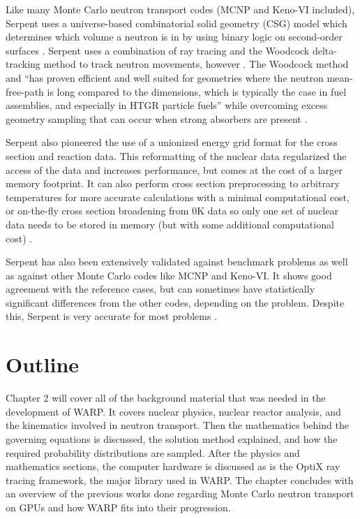 Like many Monte Carlo neutron transport codes (MCNP and Keno-VI included), Serpent uses a universe-based combinatorial solid geometry (CSG) model which determines which volume a neutron is in by using binary logic on second-order surfaces \cite{mcnp, serpent}.  Serpent uses a combination of ray tracing and the Woodcock delta-tracking method to track neutron movements, however \cite{serpent}.  The Woodcock method and ``has proven efficient and well suited for geometries where the neutron mean-free-path is long compared to the dimensions, which is typically the case in fuel assemblies, and especially in HTGR particle fuels'' while overcoming excess geometry sampling that can occur when strong absorbers are present \cite{serpent}.

Serpent also pioneered the use of a unionized energy grid format for the cross section and reaction data.  This reformatting of the nuclear data regularized the access of the data and increases performance, but comes at the cost of a larger memory footprint.  It can also perform cross section preprocessing to arbitrary temperatures for more accurate calculations with a minimal computational cost, or on-the-fly cross section broadening from 0K data so only one set of nuclear data needs to be stored in memory (but with some additional computational cost) \cite{serpent}.

Serpent has also been extensively validated against benchmark problems as well as against other Monte Carlo codes like MCNP and Keno-VI.  It shows good agreement  with the reference cases, but can sometimes have statistically significant differences from the other codes, depending on the problem.  Despite this, Serpent is very accurate for most problems \cite{serpent}.

\section{Outline}

Chapter 2 will cover all of the background material that was needed in the development of WARP.  It covers nuclear physics, nuclear reactor analysis, and the kinematics involved in neutron transport.  Then the mathematics behind the governing equations is discussed, the solution method explained, and how the required probability distributions are sampled.  After the physics and mathematics sections, the computer hardware is discussed as is the OptiX ray tracing framework, the major library used in WARP.  The chapter concludes with an overview of the previous works done regarding Monte Carlo neutron transport on GPUs and how WARP fits into their progression.

